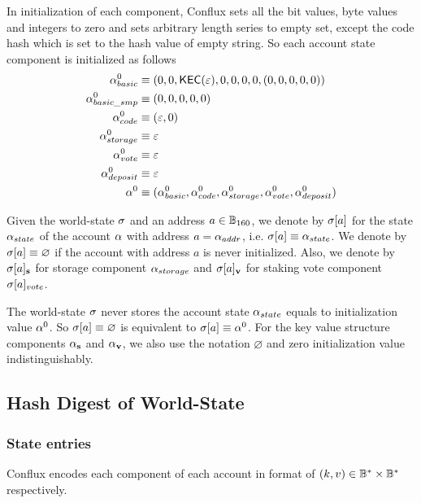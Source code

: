 In initialization of each component, Conflux sets all the bit values, byte values and integers to zero and sets arbitrary length series to empty set, except the code hash which is set to the hash value of empty string. So each account state component is initialized as follows
\begin{align}
	\mathbf{\alpha}^0_{basic} &\equiv (0,0,\mathsf{KEC}(\mathbb{\varepsilon}),0,0,0,0,(0,0,0,0,0)) \\
	\mathbf{\alpha}^0_{basic\_smp} &\equiv (0,0,0,0,0) \\
	\mathbf{\alpha}^0_{code} &\equiv (\varepsilon,0) \\
	\mathbf{\alpha}^0_{storage} &\equiv \varepsilon \\
	\mathbf{\alpha}^0_{vote} &\equiv \varepsilon \\
	\mathbf{\alpha}^0_{deposit} &\equiv \varepsilon \\
	\mathbf{\alpha}^0 & \equiv (\mathbf{\alpha}^0_{basic},\mathbf{\alpha}^0_{code},\mathbf{\alpha}^0_{storage},\mathbf{\alpha}^0_{vote},\mathbf{\alpha}^0_{deposit})\label{eq:default_account}
\end{align}

%
Given the {\name} world-state $\mathbf{\sigma}$ and an address $a\in\mathbb{B}_{160}$, we denote by $\mathbf{\sigma} [a]$ for the state $\mathbf{\alpha}_{state}$ of the account $\mathbf{\alpha}$ with address $a=\mathbf{\alpha}_{addr}$, i.e. $\mathbf{\sigma} [a] \equiv \mathbf{\alpha}_{state}$.
We denote by $\mathbf{\sigma}[a]\equiv \varnothing$ if the account with address $a$ is never initialized. 
%
Also, we denote by $\mathbf{\sigma}[a]_{\bf s}$ for storage component $\mathbf{\alpha}_{storage}$ and $\mathbf{\sigma}[a]_{\bf v}$ for staking vote component $\mathbf{\sigma}[a]_{vote}$. 

The world-state $\mathbf{\sigma}$ never stores the account state $\mathbf{\alpha}_{state}$ equals to initialization value $\mathbf{\alpha}^0$. So $\mathbf{\sigma}[a]\equiv \varnothing$ is equivalent to $\mathbf{\sigma}[a]\equiv \mathbf{\alpha}^0$. For the key value structure components $\mathbf{\alpha}_{\bf s}$ and $\mathbf{\alpha}_{\bf v}$, we also use the notation $\varnothing$ and zero initialization value indistinguishably.

\subsection{Hash Digest of World-State}

\subsubsection{State entries}

Conflux encodes each component of each account in format of $(k,v)\in \mathbb{B}^*\times \mathbb{B}^*$ respectively. 

